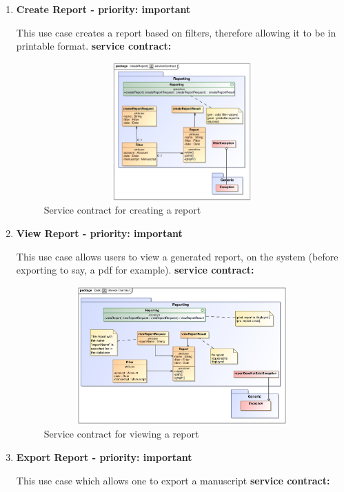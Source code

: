 \begin{enumerate}
\item\textbf{Create Report - priority: important}
\par{This use case creates a report based on filters, therefore allowing it to be in printable format.}
\textbf{service contract:}

\begin{figure}[h]
\includegraphics[height=200px, width=500px]{epsImages/Reporting/createReport.eps}
\caption{Service contract for creating a report}
\end{figure}


\item \textbf{View Report - priority: important}
\par{This use case allows users to view a generated report, on the system (before exporting to say, a pdf for example).}
\textbf{service contract:}

\begin{figure}[h]
\includegraphics[height=200px, width=500px]{epsImages/Reporting/viewReportServiceContract.eps}

\caption{Service contract for viewing a report}
\end{figure}
\newpage

\item \textbf{Export Report - priority: important}
\par{This use case which allows one to export a manuscript}
\textbf{service contract:}


\end{enumerate}
